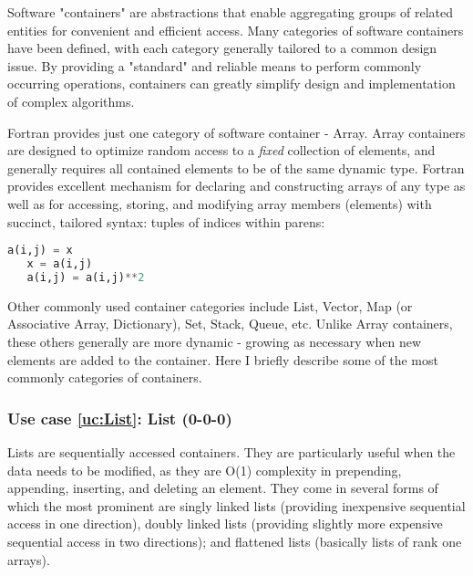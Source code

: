\documentclass{article}
\newcounter{usecase}
\newcommand{\newusecase}[2]{
\refstepcounter{usecase}\label{uc:#1}
\subsubsection{Use case \ref{uc:#1}: #1 (#2)}}
\begin{document}
 Software "containers" are abstractions that enable aggregating groups of related entities for convenient and efficient access.   Many categories of software containers have been defined, with each   category generally tailored to a common design issue.  By providing a   "standard" and reliable means to perform commonly occurring   operations, containers can greatly simplify design and   implementation of complex algorithms.

Fortran provides just one category of software container - Array.   Array containers are designed to optimize random access to a  {\em fixed} collection of elements, and generally requires all   contained elements to be of the same dynamic type.  Fortran   provides excellent mechanism for declaring and constructing arrays   of any type as well as for accessing, storing, and modifying array    members (elements) with succinct, tailored syntax: tuples of indices within parens:
   
\begin{lstlisting}[language=Python]
   a(i,j) = x
   x = a(i,j)
   a(i,j) = a(i,j)**2
\end{lstlisting}


 Other commonly used container categories include List, Vector, Map (or Associative Array, Dictionary), Set, Stack, Queue, etc.   Unlike Array containers, these others generally are more dynamic -   growing as necessary when new elements are added to the container.   Here I briefly describe some of the most commonly categories of   containers.

\newusecase{List}{0-0-0} 
Lists are sequentially accessed containers. They are
particularly useful when the data needs to be modified, as they are
O(1) complexity in prepending, appending, inserting, and deleting an
element. They come in several forms of which the most prominent are
singly linked lists (providing inexpensive sequential access in one
direction), doubly linked lists (providing slightly more expensive
sequential access in two directions); and flattened lists (basically
lists of rank one arrays).
\end{document}
